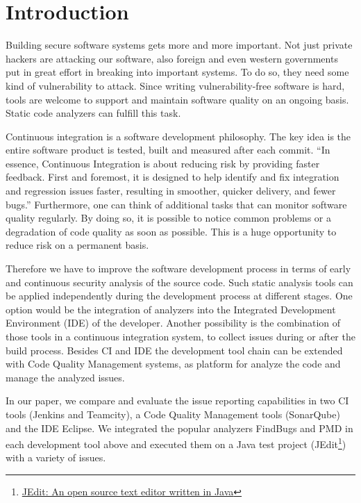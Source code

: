 \documentclass[conference]{IEEEtran}
\begin{document}
\section{Introduction}
\label{sec:introduction}
Building secure software systems gets more and more important. Not just private hackers are attacking our software, also foreign and even western governments put in great effort in breaking into important systems\cite{NSAHacking}. To do so, they need some kind of vulnerability to attack. Since writing vulnerability-free software is hard, tools are welcome to support and maintain software quality on an ongoing basis. Static code analyzers can fulfill this task.


Continuous integration is a software development philosophy. The key idea is the entire software product is tested, built and measured after each commit. ``In essence, Continuous Integration is about reducing risk by providing faster feedback. First and foremost, it is designed to help identify and fix integration and regression issues faster, resulting in smoother, quicker delivery, and fewer bugs.''\cite{Jenkins:Smart:2011} Furthermore, one can think of additional tasks that can monitor software quality regularly. By doing so, it is possible to notice common problems or a degradation of code quality as soon as possible. This is a huge opportunity to reduce risk on a permanent basis.


Therefore we have to improve the software development process in terms of early and continuous security analysis of the source code.
Such static analysis tools can be applied independently during the development process at different stages.
One option would be the integration of analyzers into the Integrated Development Environment (IDE) of the developer.
Another possibility is the combination of those tools in a continuous integration system, to collect issues during or after the build process.
Besides CI and IDE the development tool chain can be extended with Code Quality Management systems, as platform for analyze the code and manage the analyzed issues.


In our paper, we compare and evaluate the issue reporting capabilities in two CI tools (Jenkins and Teamcity), a Code Quality Management tools (SonarQube) and the IDE Eclipse.
We integrated the popular analyzers FindBugs and PMD in each development tool above and executed them on a Java test project (JEdit\footnote{\href{http://www.jedit.org/}{JEdit: An open source text editor written in Java}}) with a variety of issues.
\end{document}
